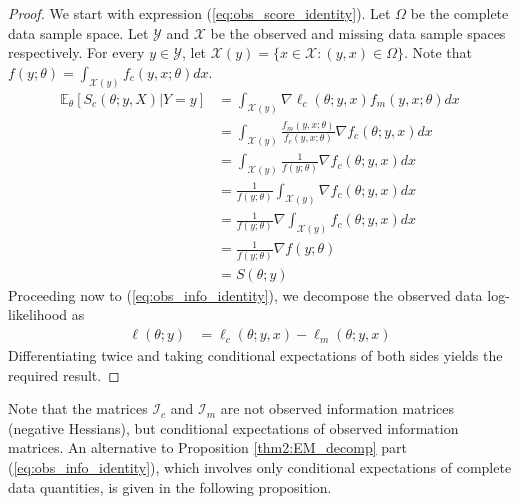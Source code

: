 \documentclass[11pt, oneside]{article}   	%
\newcommand{\bE}{\mathbb{E}}
\begin{document}
\begin{proof}
    We start with expression (\ref{eq:obs_score_identity}). Let $\Omega$ be the complete data sample space. Let $\mathcal{Y}$ and $\mathcal{X}$ be the observed and missing data sample spaces respectively. For every $y \in \mathcal{Y}$, let $\mathcal{X}(y) = \{ x \in \mathcal{X}: (y,x) \in \Omega\}$. Note that $f(y; \theta) = \int_{\mathcal{X}(y)} f_c(y, x; \theta) dx$.
    \begin{align}
        \bE_\theta [S_c(\theta; y, X)|Y=y] &= \int_{\mathcal{X}(y)} \nabla \ell_c(\theta; y, x) f_m(y, x; \theta) dx \nonumber\\
        &= \int_{\mathcal{X}(y)} \frac{f_m(y, x; \theta)}{f_c(y, x; \theta)} \nabla f_c(\theta; y, x) dx \nonumber\\
        &= \int_{\mathcal{X}(y)} \frac{1}{f(y; \theta)} \nabla f_c(\theta; y, x) dx\nonumber\\
        &= \frac{1}{f(y; \theta)} \int_{\mathcal{X}(y)} \nabla f_c(\theta; y, x) dx\nonumber\\
        &= \frac{1}{f(y; \theta)} \nabla \int_{\mathcal{X}(y)} f_c(\theta; y, x) dx \nonumber\\
        &= \frac{1}{f(y; \theta)} \nabla f(y; \theta)\nonumber\\
        &= S(\theta; y) \nonumber
    \end{align}
    Proceeding now to (\ref{eq:obs_info_identity}), we decompose the observed data log-likelihood as
    \begin{align*}
        \ell(\theta; y) &= \ell_c(\theta; y, x) - \ell_m(\theta; y, x)
    \end{align*}
    Differentiating twice and taking conditional expectations of both sides yields the required result.
\end{proof}

Note that the matrices $\mathcal{I}_c$ and $\mathcal{I}_m$ are not observed information matrices (negative Hessians), but conditional expectations of observed information matrices. 
An alternative to Proposition \ref{thm2:EM_decomp} part (\ref{eq:obs_info_identity}), which involves only conditional expectations of complete data quantities, is given in the following proposition.
\end{document}
